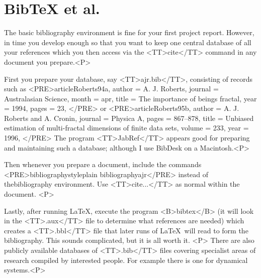 \documentclass[a5paper]{report}
\begin{document}
{\section{BibTeX et al.}
The basic bibliography environment is fine for your first project report.
However, in time you develop enough so that you want to keep one central
database of all your references which you then access via the <TT>\slosh cite</TT>
command in any document you prepare.<P>
\itemize 
\item First you prepare your database, say <TT>ajr.bib</TT>, consisting of
records such as
^^J<PRE>\atchar article{Roberts94a,
^^J   author =   {A. J. Roberts},
^^J   journal =  {Australasian Science},
^^J   month =    apr,
^^J   title =    {The importance of beings fractal},
^^J   year =     1994,
^^J   pages =    23,
^^J}</PRE>
or
^^J<PRE>\atchar article{Roberts95b,
^^J   author =  {A. J. Roberts and A. Cronin},
^^J   journal = {Physica A},
^^J   pages =   {867--878},
^^J   title =   {Unbiased estimation of multi-fractal
^^J              dimensions of finite data sets},
^^J   volume =  233,
^^J   year =    1996,
^^J}</PRE>
The program <TT>JabRef</TT> appears good for 
preparing and maintaining such a database; although I use BibDesk on a 
Macintosh.<P>
\item Then whenever you prepare a document, include the commands 
^^J<PRE>\slosh bibliographystyle{plain}
^^J\slosh bibliography{ajr}</PRE>
instead of thebibliography environment. Use <TT>\slosh cite{...}</TT> as normal
within the document.
<P>
\item Lastly, after running \LaTeX, execute the program <B>bibtex</B> (it 
will look in the <TT>.aux</TT> file to determine what references are 
needed) which creates a <TT>.bbl</TT> file that later runs of \LaTeX\ 
will read to form the bibliography.  This sounds complicated, but it 
is all worth it.
<P>
\enditemize 
There are also publicly available databases of <TT>.bib</TT> files 
covering specialist areas of research compiled by interested people.  For 
example there is one for dynamical systems.<P>
}
\end{document}
